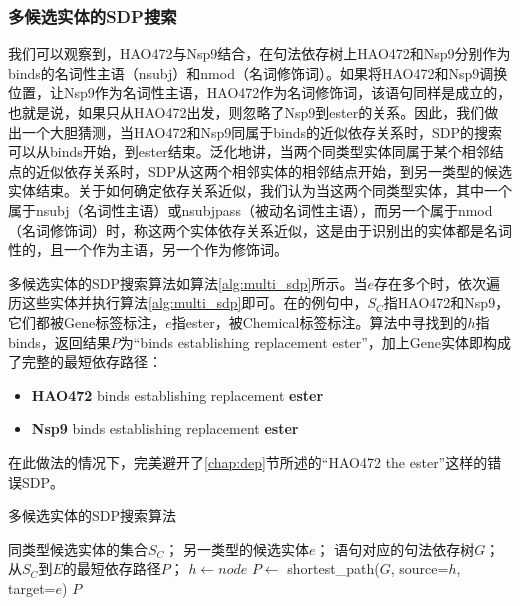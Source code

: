\documentclass[twocolumn]{article}
\begin{document}
\subsubsection{多候选实体的SDP搜索}
我们可以观察到，HAO472与Nsp9结合，在句法依存树上HAO472和Nsp9分别作为binds的名词性主语（nsubj）和nmod（名词修饰词）。如果将HAO472和Nsp9调换位置，让Nsp9作为名词性主语，HAO472作为名词修饰词，该语句同样是成立的，也就是说，如果只从HAO472出发，则忽略了Nsp9到ester的关系。因此，我们做出一个大胆猜测，当HAO472和Nsp9同属于binds的近似依存关系时，SDP的搜索可以从binds开始，到ester结束。泛化地讲，当两个同类型实体同属于某个相邻结点的近似依存关系时，SDP从这两个相邻实体的相邻结点开始，到另一类型的候选实体结束。关于如何确定依存关系近似，我们认为当这两个同类型实体，其中一个属于nsubj（名词性主语）或nsubjpass（被动名词性主语），而另一个属于nmod（名词修饰词）时，称这两个实体依存关系近似，这是由于识别出的实体都是名词性的，且一个作为主语，另一个作为修饰词。\par
多候选实体的SDP搜索算法如算法\ref{alg:multi_sdp}所示。当$e$存在多个时，依次遍历这些实体并执行算法\ref{alg:multi_sdp}即可。在\cite{hao472}的例句中，$S_C$指HAO472和Nsp9，它们都被Gene标签标注，$e$指ester，被Chemical标签标注。算法中寻找到的$h$指binds，返回结果$P$为“binds establishing replacement ester”，加上Gene实体即构成了完整的最短依存路径：\par
\begin{itemize}
	\item \textbf{HAO472} binds establishing replacement \textbf{ester}
	\item \textbf{Nsp9} binds establishing replacement \textbf{ester}
\end{itemize}\par
在此做法的情况下，完美避开了\ref{chap:dep}节所述的“HAO472 the ester”这样的错误SDP。\par

\begin{algorithm}[htb]
	\caption{多候选实体的SDP搜索算法}
	\label{alg:multi_sdp}
	\begin{algorithmic}[1]
		\REQUIRE
		同类型候选实体的集合$S_C$；
		另一类型的候选实体$e$；
		语句对应的句法依存树$G$；
		\ENSURE
		从$S_C$到$E$的最短依存路径$P$；
		\STATE $h \gets node$
		\ENDIF
		\ENDFOR
		\STATE $P \gets$ shortest\_path($G$, source=$h$, target=$e$) 
		\ENDIF
		\RETURN $P$
	\end{algorithmic} 
\end{algorithm}
\end{document}
